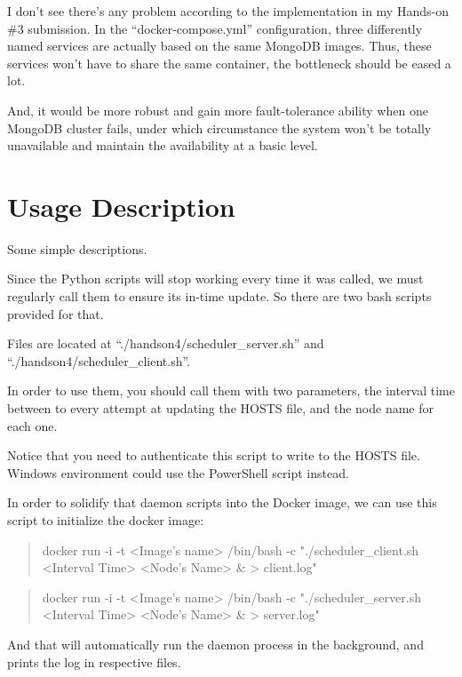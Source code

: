 \documentclass[11pt, oneside]{article}   	%
\begin{document}
I don't see there's any problem according to the implementation in my Hands-on \#3 submission. In the ``docker-compose.yml'' configuration, three differently named services are actually based on the same MongoDB images. Thus, these services won't have to share the same container, the bottleneck should be eased a lot.

And, it would be more robust and gain more fault-tolerance ability when one MongoDB cluster fails, under which circumstance the system won't be totally unavailable and maintain the availability at a basic level.

\section*{Usage Description}
Some simple descriptions.

Since the Python scripts will stop working every time it was called, we must regularly call them to ensure its in-time update. So there are two bash scripts provided for that.

Files are located at ``./handson4/scheduler\_server.sh'' and ``./handson4/scheduler\_client.sh''.

In order to use them, you should call them with two parameters, the interval time between to every attempt at updating the HOSTS file, and the node name for each one.

Notice that you need to authenticate this script to write to the HOSTS file. Windows environment could use the PowerShell script instead.

In order to solidify that daemon scripts into the Docker image, we can use this script to initialize the docker image:

\begin{verse}
docker run -i -t <Image's name> /bin/bash -c "./scheduler\_client.sh <Interval Time> <Node's Name> \& > client.log"
\end{verse}

\begin{verse}
docker run -i -t <Image's name> /bin/bash -c "./scheduler\_server.sh <Interval Time> <Node's Name> \& > server.log"
\end{verse}

And that will automatically run the daemon process in the background, and prints the log in respective files.
\end{document}
